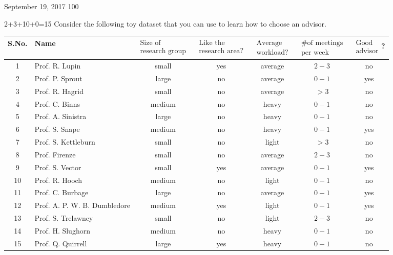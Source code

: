 \documentclass[a4paper,11pt]{article}
\begin{document}
           {September 19, 2017}      			           		%
					 {100}																				%

\begin{mlproblem}{2+3+10+0=15}
Consider the following toy dataset that you can use to learn how to choose an advisor.
\begin{table}[h!]
\centering
{\small
\begin{tabular}{| c | l | c | c | c | c | c |}
	\hline
	S.No. & Name  & $\substack{\text{Size of}\\\text{research group}}$ & $\substack{\text{Like the}\\\text{research area?}}$ & $\substack{\text{Average}\\\text{workload?}}$ & $\substack{\text{\# of meetings}\\\text{per week}}$ & $\substack{\text{Good}\\\text{advisor}}$? \\ \hline
	1 & Prof. R. Lupin & small  & yes & average  & $2-3$ & no \\ \hline
	2 & Prof. P. Sprout & large  & no  & average  & $0-1$ & yes \\ \hline
	3 & Prof. R. Hagrid & small  & no  & average  & $> 3$ & no \\ \hline
	4 & Prof. C. Binns & medium & no  & heavy & $0-1$ & no \\ \hline
	5 & Prof. A. Sinistra & large  & no  & heavy & $0-1$ & no \\ \hline
	6 & Prof. S. Snape & medium & no  & heavy & $0-1$ & yes \\ \hline
	7 & Prof. S. Kettleburn & small  & no  & light & $> 3$ & no \\ \hline
	8 & Prof. Firenze & small  & no  & average  & $2-3$ & no \\ \hline
	9 & Prof. S. Vector & small  & yes & average  & $0-1$ & yes \\ \hline
	10 & Prof. R. Hooch & medium & no  & light & $0-1$ & no \\ \hline
	11 & Prof. C. Burbage & large  & no  & average  & $0-1$ & yes \\ \hline
	12 & Prof. A. P. W. B. Dumbledore & medium & yes & light & $0-1$ & yes \\ \hline
	13 & Prof. S. Trelawney & small  & no  & light & $2-3$ & no \\ \hline
	14 & Prof. H. Slughorn & medium & no  & heavy & $0-1$ & no \\ \hline
	15 & Prof. Q. Quirrell & large  & yes & heavy & $0-1$ & no \\ \hline
\end{tabular}
}
\end{table}


\end{mlproblem}
\end{document}
